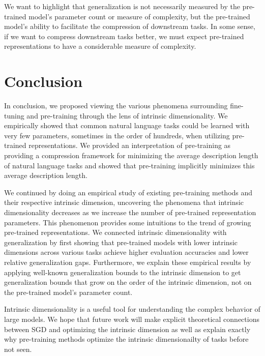 We want to highlight that generalization is not necessarily measured by the pre-trained model's parameter count or measure of complexity, but the pre-trained model's ability to facilitate the compression of downstream tasks. In some sense, if we want to compress downstream tasks better, we must expect pre-trained representations to have a considerable measure of complexity.

\section{Conclusion}
In conclusion, we proposed viewing the various phenomena surrounding fine-tuning and pre-training through the lens of intrinsic dimensionality. We empirically showed that common natural language tasks could be learned with very few parameters, sometimes in the order of hundreds, when utilizing pre-trained representations.  We provided an interpretation of pre-training as providing a compression framework for minimizing the average description length of natural language tasks and showed that pre-training implicitly minimizes this average description length.

We continued by doing an empirical study of existing pre-training methods and their respective intrinsic dimension, uncovering the phenomena that intrinsic dimensionality decreases as we increase the number of pre-trained representation parameters. This phenomenon provides some intuitions to the trend of growing pre-trained representations. We connected intrinsic dimensionality with generalization by first showing that pre-trained models with lower intrinsic dimensions across various tasks achieve higher evaluation accuracies and lower relative generalization gaps. Furthermore, we explain these empirical results by applying well-known generalization bounds to the intrinsic dimension to get generalization bounds that grow on the order of the intrinsic dimension, not on the pre-trained model's parameter count.

Intrinsic dimensionality is a useful tool for understanding the complex behavior of large models. We hope that future work will make explicit theoretical connections between SGD and optimizing the intrinsic dimension as well as explain exactly why pre-training methods optimize the intrinsic dimensionailty of tasks before not seen.


